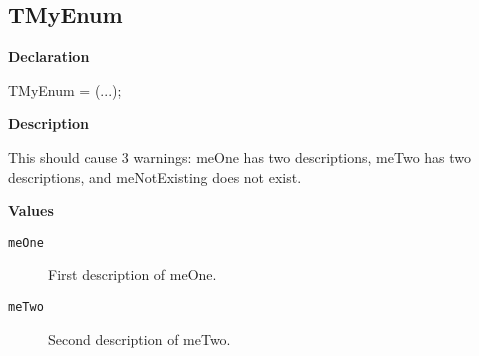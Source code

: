 \documentclass{report}
\newif\ifpdf
\begin{document}
\subsection*{TMyEnum}
\fi
\label{warning_value_member_tags-TMyEnum}
\begin{list}{}{
\setlength{\itemindent}{0cm}
\setlength{\listparindent}{0cm}
\setlength{\leftmargin}{\evensidemargin}
\addtolength{\leftmargin}{\tmplength}
\settowidth{\labelsep}{X}
\addtolength{\leftmargin}{\labelsep}
\setlength{\labelwidth}{\tmplength}
}
\item[\textbf{Declaration}\hfill]
\ifpdf
\begin{flushleft}
\fi
\begin{ttfamily}
TMyEnum = (...);\end{ttfamily}

\ifpdf
\end{flushleft}
\fi

\par
\item[\textbf{Description}]
 





This should cause 3 warnings: meOne has two descriptions, meTwo has two descriptions, and meNotExisting does not exist.\item[\textbf{Values}]
\begin{description}
\item[\texttt{meOne}] \label{warning_value_member_tags-meOne}
\index{}
First description of meOne.
\item[\texttt{meTwo}] \label{warning_value_member_tags-meTwo}
\index{}
Second description of meTwo.
\end{description}


\end{list}
\end{document}
